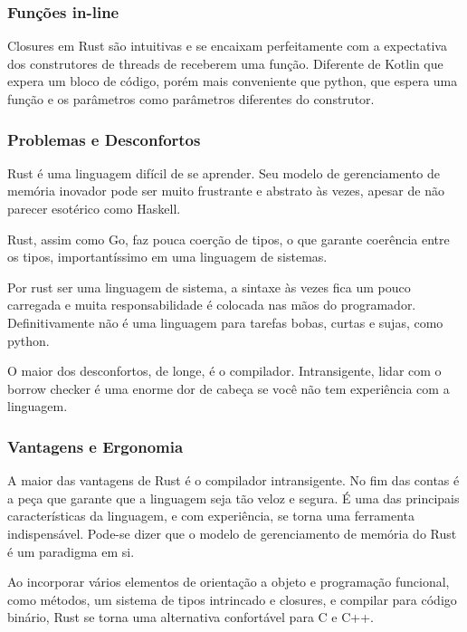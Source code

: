 \documentclass[12pt,a4paper]{article}
\begin{document}
\subsubsection{Funções in-line}
\label{sssec:rust funcoes inline}

Closures em Rust são intuitivas e se encaixam perfeitamente com a expectativa dos construtores de threads de receberem uma função. Diferente de Kotlin que expera um bloco de código, porém mais conveniente que python, que espera uma função e os parâmetros como parâmetros diferentes do construtor.

\subsubsection{Problemas e Desconfortos}
\label{sssec:rust problemas}

Rust é uma linguagem difícil de se aprender. Seu modelo de gerenciamento de memória inovador pode ser muito frustrante e abstrato às vezes, apesar de não parecer esotérico como Haskell.

Rust, assim como Go, faz pouca coerção de tipos, o que garante coerência entre os tipos, importantíssimo em uma linguagem de sistemas.

Por rust ser uma linguagem de sistema, a sintaxe às vezes fica um pouco carregada e muita responsabilidade é colocada nas mãos do programador. Definitivamente não é uma linguagem para tarefas bobas, curtas e sujas, como python.

O maior dos desconfortos, de longe, é o compilador. Intransigente, lidar com o borrow checker é uma enorme dor de cabeça se você não tem experiência com a linguagem.

\subsubsection{Vantagens e Ergonomia}
\label{sssec:rust vantagens}

A maior das vantagens de Rust é o compilador intransigente. No fim das contas é a peça que garante que a linguagem seja tão veloz e segura. É uma das principais características da linguagem, e com experiência, se torna uma ferramenta indispensável. Pode-se dizer que o modelo de gerenciamento de memória do Rust é um paradigma em si.

Ao incorporar vários elementos de orientação a objeto e programação funcional, como métodos, um sistema de tipos intrincado e closures, e compilar para código binário, Rust se torna uma alternativa confortável para C e C++.
\end{document}
